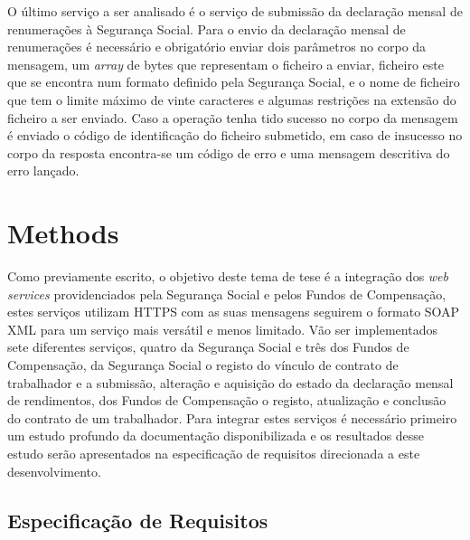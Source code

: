 \documentclass[sigplan]{acmart}
\begin{document}
O último serviço a ser analisado é o serviço de submissão da declaração mensal de renumerações à Segurança Social. Para o envio da declaração mensal de renumerações é necessário e obrigatório enviar dois parâmetros no corpo da mensagem, um \textit{array} de bytes que representam o ficheiro a enviar, ficheiro este que se encontra num formato definido pela Segurança Social, e o nome de ficheiro que tem o limite máximo de vinte caracteres e algumas restrições na extensão do ficheiro a ser enviado. Caso a operação tenha tido sucesso no corpo da mensagem é enviado o código de identificação do ficheiro submetido, em caso de insucesso no corpo da resposta encontra-se um código de erro e uma mensagem descritiva do erro lançado.

\section{Methods} \label{sec:methods}

Como previamente escrito, o objetivo deste tema de tese é a integração dos \textit{web services} providenciados pela Segurança Social e pelos Fundos de Compensação, estes serviços utilizam HTTPS com as suas mensagens seguirem o formato SOAP XML para um serviço mais versátil e menos limitado. Vão ser implementados sete diferentes serviços, quatro da Segurança Social e três dos Fundos de Compensação, da Segurança Social o registo do vínculo de contrato de trabalhador e a submissão, alteração e aquisição do estado da declaração mensal de rendimentos, dos Fundos de Compensação o registo, atualização e conclusão do contrato de um trabalhador. Para integrar estes serviços é necessário primeiro um estudo profundo da documentação disponibilizada e os resultados desse estudo serão apresentados na especificação de requisitos direcionada a este desenvolvimento.

\subsection{Especificação de Requisitos}
\end{document}
